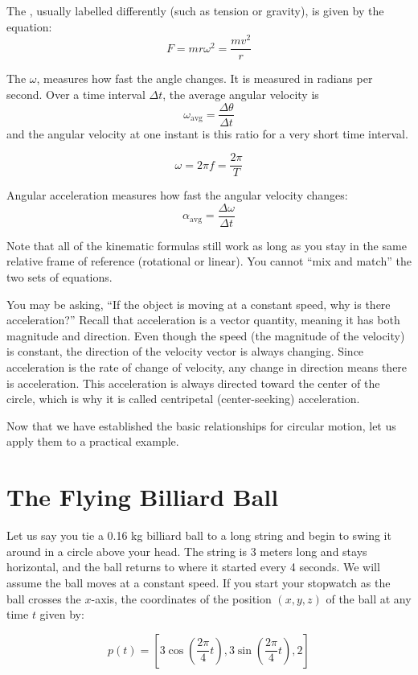 The , usually labelled differently (such as tension or gravity), is given by the equation:
$$F = m r \omega^2 = \frac{m v^2}{r}$$


The  $\omega$, measures how fast the angle changes. It is measured in radians per second. Over a time interval $\Delta t$, the average angular velocity is
\[
  \omega_{\text{avg}} = \frac{\Delta\theta}{\Delta t}
\]
and the angular velocity at one instant is this ratio for a very short time interval.

\[
  \omega = 2\pi f = \frac{2\pi}{T}
\]

Angular acceleration measures how fast the angular velocity changes:
\[
  \alpha_{\text{avg}} = \frac{\Delta\omega}{\Delta t}
\]

Note that all of the kinematic formulas still work as long as you stay in the same relative frame of reference (rotational or linear). You cannot ``mix and match'' the two sets of equations.

You may be asking, ``If the object is moving at a constant speed, why is there acceleration?'' Recall that acceleration is a vector quantity, meaning it has both magnitude and direction. Even though the speed (the magnitude of the velocity) is constant, the direction of the velocity vector is always changing. Since acceleration is the rate of change of velocity, any change in direction means there is acceleration. This acceleration is always directed toward the center of the circle, which is why it is called centripetal (center-seeking) acceleration.

Now that we have established the basic relationships for circular motion, let us apply them to a practical example.
\section{The Flying Billiard Ball}
Let us say you tie a 0.16 kg billiard ball to a long string and begin to swing it around in a circle above your head. The string is 3 meters long and stays horizontal, and the ball returns to where it started every 4 seconds. We will assume the ball moves at a constant speed. If you start your stopwatch as the ball crosses the $x$-axis, the coordinates of the position $(x,y,z)$ of the ball at any time $t$ given by:

$$p(t) = \left[3 \cos{\left( \frac{2 \pi} {4}t\right)}, 3 \sin{ \left( \frac{2 \pi}{4}t\right) }, 2\right]$$

